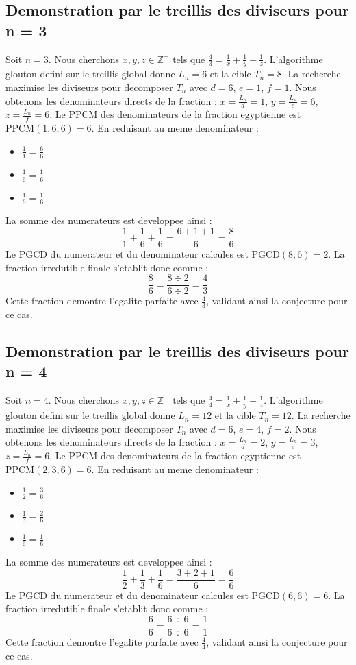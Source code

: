\documentclass[11pt,a4paper]{article}
\begin{document}
\subsection{Demonstration par le treillis des diviseurs pour n = 3}
Soit $n = 3$. Nous cherchons $x, y, z \in \mathbb{Z}^{+}$ tels que $\frac{4}{3} = \frac{1}{x} + \frac{1}{y} + \frac{1}{z}$.
L'algorithme glouton defini sur le treillis global donne $L_n = 6$ et la cible $T_n = 8$.
La recherche maximise les diviseurs pour decomposer $T_n$ avec $d = 6$, $e = 1$, $f = 1$.
Nous obtenons les denominateurs directs de la fraction : $x = \frac{L_n}{d} = 1$, $y = \frac{L_n}{e} = 6$, $z = \frac{L_n}{f} = 6$.
Le PPCM des denominateurs de la fraction egyptienne est $\text{PPCM}(1, 6, 6) = 6$.
En reduisant au meme denominateur :
\begin{itemize}
    \item $\frac{1}{1} = \frac{6}{6}$
    \item $\frac{1}{6} = \frac{1}{6}$
    \item $\frac{1}{6} = \frac{1}{6}$
\end{itemize}
La somme des numerateurs est developpee ainsi :
$$ \frac{1}{1} + \frac{1}{6} + \frac{1}{6} = \frac{6 + 1 + 1}{6} = \frac{8}{6} $$
Le PGCD du numerateur et du denominateur calcules est $\text{PGCD}(8, 6) = 2$.
La fraction irredutible finale s'etablit donc comme :
$$ \frac{8}{6} = \frac{8 \div 2}{6 \div 2} = \frac{4}{3} $$
Cette fraction demontre l'egalite parfaite avec $\frac{4}{3}$, validant ainsi la conjecture pour ce cas.

\subsection{Demonstration par le treillis des diviseurs pour n = 4}
Soit $n = 4$. Nous cherchons $x, y, z \in \mathbb{Z}^{+}$ tels que $\frac{4}{4} = \frac{1}{x} + \frac{1}{y} + \frac{1}{z}$.
L'algorithme glouton defini sur le treillis global donne $L_n = 12$ et la cible $T_n = 12$.
La recherche maximise les diviseurs pour decomposer $T_n$ avec $d = 6$, $e = 4$, $f = 2$.
Nous obtenons les denominateurs directs de la fraction : $x = \frac{L_n}{d} = 2$, $y = \frac{L_n}{e} = 3$, $z = \frac{L_n}{f} = 6$.
Le PPCM des denominateurs de la fraction egyptienne est $\text{PPCM}(2, 3, 6) = 6$.
En reduisant au meme denominateur :
\begin{itemize}
    \item $\frac{1}{2} = \frac{3}{6}$
    \item $\frac{1}{3} = \frac{2}{6}$
    \item $\frac{1}{6} = \frac{1}{6}$
\end{itemize}
La somme des numerateurs est developpee ainsi :
$$ \frac{1}{2} + \frac{1}{3} + \frac{1}{6} = \frac{3 + 2 + 1}{6} = \frac{6}{6} $$
Le PGCD du numerateur et du denominateur calcules est $\text{PGCD}(6, 6) = 6$.
La fraction irredutible finale s'etablit donc comme :
$$ \frac{6}{6} = \frac{6 \div 6}{6 \div 6} = \frac{1}{1} $$
Cette fraction demontre l'egalite parfaite avec $\frac{4}{4}$, validant ainsi la conjecture pour ce cas.
\end{document}
